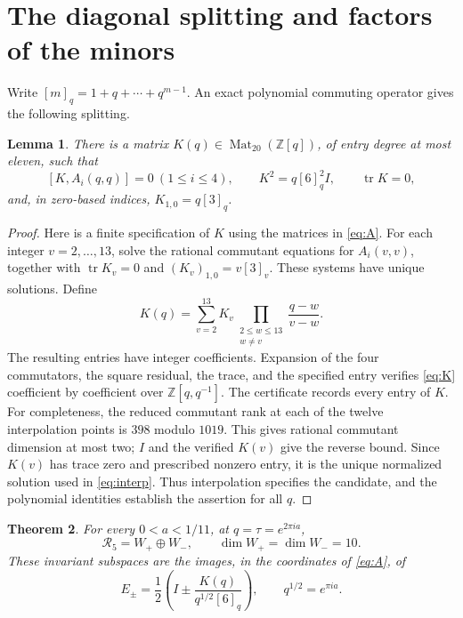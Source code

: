\documentclass[11pt,a4paper]{article}
\newtheorem{theorem}{Theorem}
\newtheorem{lemma}[theorem]{Lemma}
\newcommand{\Z}{\mathbb Z}
\newcommand{\Rcal}{\mathcal R}
\newcommand{\tr}{\operatorname{tr}}
\begin{document}
\section{The diagonal splitting and factors of the minors}

Write $[m]_q=1+q+\cdots+q^{m-1}$.
An exact polynomial commuting operator gives the following splitting.

\begin{lemma}\label{lem:K}
There is a matrix $K(q)\in\operatorname{Mat}_{20}(\Z[q])$,
of entry degree at most eleven, such that
\begin{equation}\label{eq:K}
 [K,A_i(q,q)]=0\ (1\le i\le4),\qquad
 K^2=q[6]_q^2I,\qquad \tr K=0,
\end{equation}
and, in zero-based indices, $K_{1,0}=q[3]_q$.
\end{lemma}

\begin{proof}
Here is a finite specification of $K$ using the matrices in
\eqref{eq:A}. For each integer $v=2,\ldots,13$, solve the rational
commutant equations for $A_i(v,v)$, together with
$\tr K_v=0$ and $(K_v)_{1,0}=v[3]_v$.
These systems have unique solutions. Define
\begin{equation}\label{eq:interp}
 K(q)=\sum_{v=2}^{13}K_v
       \prod_{\substack{2\le w\le13\\w\ne v}}\frac{q-w}{v-w}.
\end{equation}
The resulting entries have integer coefficients. Expansion of the
four commutators, the square residual, the trace, and the specified
entry verifies \eqref{eq:K} coefficient by coefficient over
$\Z[q,q^{-1}]$. The certificate records every entry of $K$.
For completeness, the reduced commutant rank at each of the twelve
interpolation points is $398$ modulo $1019$. This gives rational
commutant dimension at most two; $I$ and the verified $K(v)$ give
the reverse bound. Since $K(v)$ has trace zero and prescribed nonzero
entry, it is the unique normalized solution used in \eqref{eq:interp}.
Thus interpolation specifies the candidate, and the polynomial
identities establish the assertion for all $q$.
\end{proof}

\begin{theorem}\label{thm:diagonal}
For every $0<a<1/11$, at $q=\tau=e^{2\pi ia}$,
\[
 \Rcal_5=W_+\oplus W_-,\qquad \dim W_+=\dim W_-=10.
\]
These invariant subspaces are the images, in the coordinates of
\eqref{eq:A}, of
\begin{equation}\label{eq:projectors}
 E_\pm=\frac12\left(I\pm\frac{K(q)}{q^{1/2}[6]_q}\right),
 \qquad q^{1/2}=e^{\pi ia}.
\end{equation}
\end{theorem}
\end{document}
